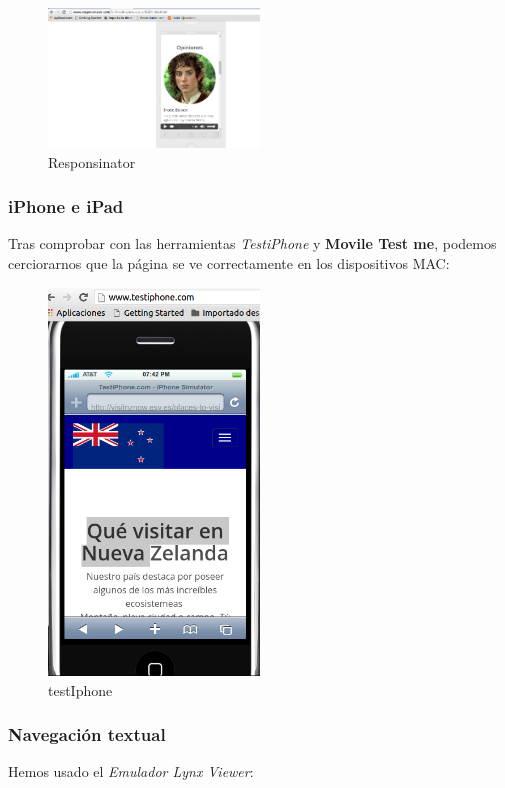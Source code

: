 \begin{figure}[h]
	\centering
	\includegraphics[width=0.50\textwidth]{./Fotos/responsinator.png}
	\caption{Responsinator}
	\label{fig: Responsinator}
\end{figure}

\subsubsection{iPhone e iPad}
Tras comprobar con las herramientas \textit{TestiPhone} y \textbf{Movile Test me}, podemos cerciorarnos que la página se ve correctamente en los dispositivos MAC:
\begin{figure}[h]
	\centering
	\includegraphics[width=0.50\textwidth]{./Fotos/testiphone.png}
	\caption{testIphone}
	\label{fig: testIphone}
\end{figure}

\subsubsection{Navegación textual}
Hemos usado el \textit{Emulador Lynx Viewer}:

